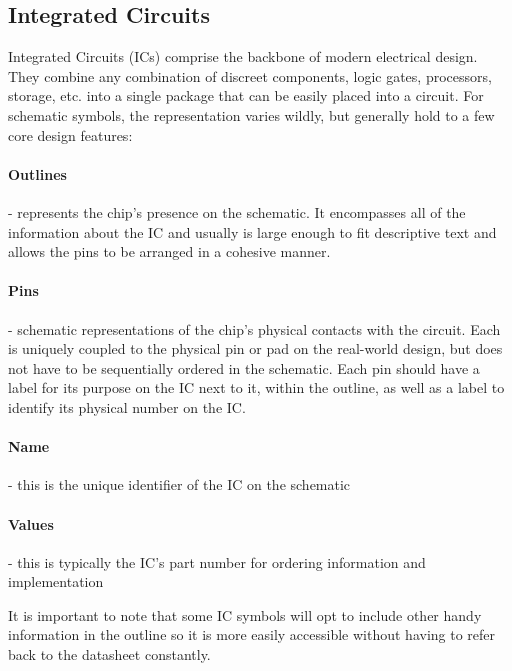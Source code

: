

    \subsection{Integrated Circuits}
    Integrated Circuits (ICs) comprise the backbone of modern electrical design.
    They combine any combination of discreet components, logic gates, processors, storage, etc. into a single package that can be easily placed into a circuit.
    For schematic symbols, the representation varies wildly, but generally hold to a few core design features:
        \paragraph*{Outlines} - represents the chip's presence on the schematic. 
        It encompasses all of the information about the IC and usually is large enough to fit descriptive text and allows the pins to be arranged in a cohesive manner.

        \paragraph*{Pins} - schematic representations of the chip's physical contacts with the circuit. 
        Each is uniquely coupled to the physical pin or pad on the real-world design, but does not have to be sequentially ordered in the schematic.
        Each pin should have a label for its purpose on the IC next to it, within the outline, as well as a label to identify its physical number on the IC.

        \paragraph*{Name} - this is the unique identifier of the IC on the schematic

        \paragraph*{Values} - this is typically the IC's part number for ordering information and implementation

    It is important to note that some IC symbols will opt to include other handy information in the outline so it is more easily accessible without having to refer back to the datasheet constantly.



